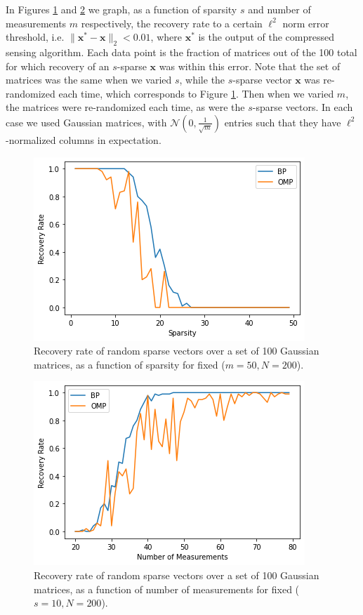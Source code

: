 \documentclass[12pt,a4paper]{amsart}
\numberwithin{equation}{section}
\theoremstyle{plain}
\theoremstyle{definition}
\newcommand{\bdx}{\mathbf{x}}
\begin{document}
In Figures \ref{rec_rate_spar} and \ref{rec_rate_meas} we graph, as a function of sparsity $s$ and number of measurements $m$ respectively, the recovery rate to a certain $\ell^2$ norm error threshold, i.e. $\|\bdx^*-\bdx\|_2<0.01$, where $\bdx^*$ is the output of the compressed sensing algorithm. Each data point is the fraction of matrices out of the 100 total for which recovery of an $s$-sparse $\bdx$ was within this error. Note that the set of matrices was the same when we varied $s$, while the $s$-sparse vector $\bdx$ was re-randomized each time, which corresponds to Figure \ref{rec_rate_spar}. Then when we varied $m$, the matrices were re-randomized each time, as were the $s$-sparse vectors. In each case we used Gaussian matrices, with $\mathcal{N}(0,\frac{1}{\sqrt{m}})$ entries such that they have $\ell^2$-normalized columns in expectation.

\begin{figure}
    \centering
    \includegraphics[scale = 0.7]{bp_omp_recovery_rate_m_constant_final.png}
    \caption{Recovery rate of random sparse vectors over a set of 100 Gaussian matrices, as a function of sparsity for fixed ($m=50,N=200$).}
    \label{rec_rate_spar}
\end{figure}

\begin{figure}
    \centering
    \includegraphics[scale = 0.7]{bp_omp_recovery_rate_s_constant.png}
    \caption{Recovery rate of random sparse vectors over a set of 100 Gaussian matrices, as a function of number of measurements for fixed ($s=10,N=200$).}
    \label{rec_rate_meas}
\end{figure}
\end{document}
